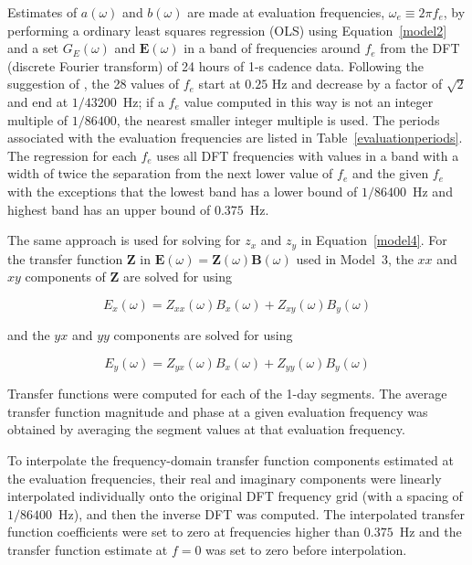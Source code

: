 \documentclass[draft,linenumbers]{agujournal2018}
\begin{document}
Estimates of $a(\omega)$ and $b(\omega)$ are made at evaluation frequencies, $\omega_e \equiv 2\pi f_e$, by performing a ordinary least squares regression (OLS) using Equation~\ref{model2} and a set $G_E(\omega)$ and $\mathbf{E}(\omega)$ in a band of frequencies around $f_e$ from the DFT (discrete Fourier transform) of 24 hours of 1-s cadence data. Following the suggestion of \cite{Simpson2005}, the 28 values of $f_e$ start at $0.25$ Hz and decrease by a factor of $\sqrt{2}$ and end at $1/43200$~Hz; if a $f_e$ value computed in this way is not an integer multiple of $1/86400$, the nearest smaller integer multiple is used. The periods associated with the evaluation frequencies are listed in Table~\ref{evaluationperiods}. The regression for each $f_e$ uses all DFT frequencies with values in a band with a width of twice the separation from the next lower value of $f_e$ and the given $f_e$ with the exceptions that the lowest band has a lower bound of $1/86400$~Hz and highest band has an upper bound of $0.375$~Hz. 

The same approach is used for solving for $z_x$ and $z_y$ in Equation~\ref{model4}. For the transfer function $\boldsymbol{Z}$ in $\mathbf{E}(\omega) = \boldsymbol{Z}(\omega)\mathbf{B}(\omega)$ used in Model~3, the $xx$ and $xy$ components of $\boldsymbol{Z}$ are solved for using 

\begin{linenomath*}
\begin{equation*}
E_x(\omega) = Z_{xx}(\omega)B_x(\omega) + Z_{xy}(\omega)B_{y}(\omega)
\end{equation*}
\end{linenomath*}

\noindent
and the $yx$ and $yy$ components are solved for using 

\begin{linenomath*}
\begin{equation*}
E_y(\omega) = Z_{yx}(\omega)B_x(\omega) + Z_{yy}(\omega)B_y(\omega)
\end{equation*}
\end{linenomath*}

Transfer functions were computed for each of the 1-day segments. The average transfer function magnitude and phase at a given evaluation frequency was obtained by averaging the segment values at that evaluation frequency.

To interpolate the frequency-domain transfer function components estimated at the evaluation frequencies, their real and imaginary components were linearly interpolated individually onto the original DFT frequency grid (with a spacing of $1/86400$~Hz), and then the inverse DFT was computed. The interpolated transfer function coefficients were set to zero at frequencies higher than $0.375$~Hz and the transfer function estimate at $f=0$ was set to zero before interpolation.
\end{document}
